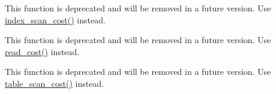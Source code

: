 
\begin{DoxyRefList}
\item[\label{deprecated__deprecated000003}%
\Hypertarget{deprecated__deprecated000003}%
Member \mbox{\hyperlink{classhandler_a4a2ac6b2908a899c0ce230818bb7a993}{handler\+:\+:index\+\_\+only\+\_\+read\+\_\+time}} (uint keynr, double records)]This function is deprecated and will be removed in a future version. Use \mbox{\hyperlink{classhandler_a5575d58c0acbb1924f7f3d3eb756612a}{index\+\_\+scan\+\_\+cost()}} instead.  
\item[\label{deprecated__deprecated000002}%
\Hypertarget{deprecated__deprecated000002}%
Member \mbox{\hyperlink{classhandler_a061b519fb16fbff126b0e21530973c2e}{handler\+:\+:read\+\_\+time}} (uint index, uint ranges, ha\+\_\+rows rows)]This function is deprecated and will be removed in a future version. Use \mbox{\hyperlink{classhandler_a196d85fe55a71cc09c642592e771b662}{read\+\_\+cost()}} instead. 
\item[\label{deprecated__deprecated000001}%
\Hypertarget{deprecated__deprecated000001}%
Member \mbox{\hyperlink{classhandler_a65f8e5188e2bd9636a564bbc0c3fef86}{handler\+:\+:scan\+\_\+time}} ()]This function is deprecated and will be removed in a future version. Use \mbox{\hyperlink{classhandler_a5e9380355a7eea5386ef061f36479258}{table\+\_\+scan\+\_\+cost()}} instead. 
\end{DoxyRefList}